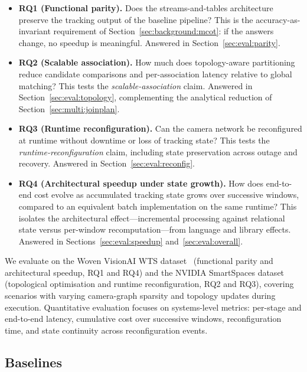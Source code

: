 \documentclass[5p,times]{elsarticle}
\begin{document}
\begin{itemize}[leftmargin=*]
    \item \textbf{RQ1 (Functional parity).} Does the streams-and-tables architecture preserve
    the tracking output of the baseline pipeline? This is the accuracy-as-invariant requirement
    of Section~\ref{sec:background:mcot}: if the answers change, no speedup is meaningful.
    Answered in Section~\ref{sec:eval:parity}.
    \item \textbf{RQ2 (Scalable association).} How much does topology-aware partitioning reduce
    candidate comparisons and per-association latency relative to global matching? This tests
    the \emph{scalable-association} claim. Answered in Section~\ref{sec:eval:topology},
    complementing the analytical reduction of Section~\ref{sec:multi:joinplan}.
    \item \textbf{RQ3 (Runtime reconfiguration).} Can the camera network be reconfigured at
    runtime without downtime or loss of tracking state? This tests the
    \emph{runtime-reconfiguration} claim, including state preservation across outage and
    recovery. Answered in Section~\ref{sec:eval:reconfig}.
    \item \textbf{RQ4 (Architectural speedup under state growth).} How does end-to-end cost
    evolve as accumulated tracking state grows over successive windows, compared to an
    equivalent batch implementation on the same runtime? This isolates the architectural
    effect---incremental processing against relational state versus per-window
    recomputation---from language and library effects. Answered in
    Sections~\ref{sec:eval:speedup} and~\ref{sec:eval:overall}.
    
\end{itemize}
 
We evaluate on the Woven VisionAI WTS dataset~\cite{kong2024wts} (functional parity and
architectural speedup, RQ1 and RQ4) and the NVIDIA SmartSpaces dataset~\cite{aicity2025track1}
(topological optimisation and runtime reconfiguration, RQ2 and RQ3), covering scenarios with
varying camera-graph sparsity and topology updates during execution. Quantitative evaluation
focuses on systems-level metrics: per-stage and end-to-end latency, cumulative cost over
successive windows, reconfiguration time, and state continuity across reconfiguration events.


\subsection{Baselines}
\end{document}
